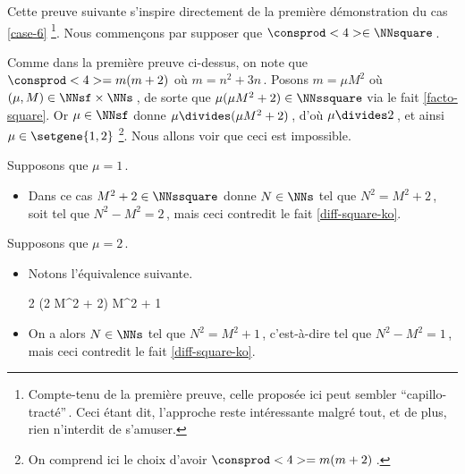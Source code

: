 Cette preuve suivante s'inspire directement de la première démonstration du cas \ref{case-6}
\footnote{
	Compte-tenu de la première preuve, celle proposée ici peut sembler \enquote{capillo-tracté}\,. Ceci étant dit, l'approche reste intéressante malgré tout, et de plus, rien n'interdit de s'amuser.
}.
Nous commençons par supposer que $\consprod<4> \in \NNsquare$\,.

\smallskip

Comme dans la première preuve ci-dessus, on note que $\consprod<4> = m (m + 2)$ où $m = n^2 + 3n$\,.
Posons $m = \mu M^2$ où $(\mu, M) \in \NNsf \times \NNs$\,,
de sorte que $\mu (\mu M^2 + 2) \in \NNssquare$ via le fait \ref{facto-square}.
Or $\mu \in \NNsf$ donne $\mu \divides (\mu M^2 + 2)$\,, 
d'où $\mu \divides 2$\,, et ainsi $\mu \in \setgene{1, 2}$
\footnote{
	On comprend ici le choix d'avoir $\consprod<4> = m (m + 2)$\,.
}.
Nous allons voir que ceci est impossible.

\medskip

Supposons que $\mu = 1$\,.
%
\begin{itemize}
	\item Dans ce cas $M^2 + 2 \in \NNssquare$ donne $N \in \NNs$ tel que $N^2 = M^2 + 2$\,, soit tel que $N^2 - M^2 = 2$\,, mais ceci contredit le fait \ref{diff-square-ko}.
\end{itemize}

\medskip

	Supposons que $\mu = 2$\,.
%
\begin{itemize}
	\item Notons l'équivalence suivante.
    
	\medskip
    \noindent\kern-10pt%
    \begin{stepcalc}[style=ar*, ope=\iff]
    	2 (2 M^2 + 2) \in \NNssquare
    	M^2 + 1 \in \NNssquare
    \end{stepcalc}

	\item On a alors $N \in \NNs$ tel que $N^2 = M^2 + 1$\,, c'est-à-dire tel que $N^2 - M^2 = 1$\,, mais ceci contredit le fait \ref{diff-square-ko}.
	\qedhere 
\end{itemize}